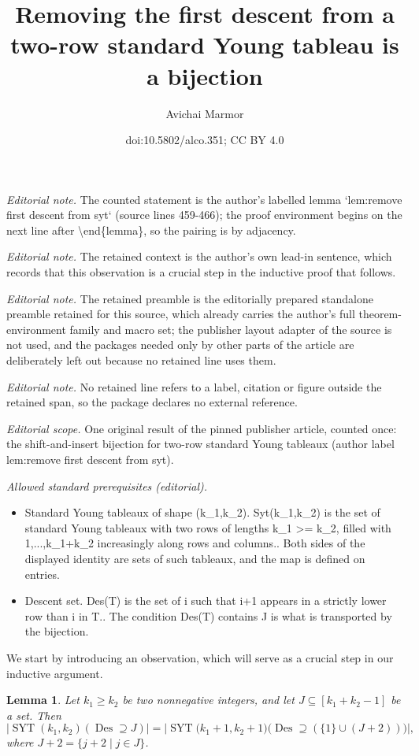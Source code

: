 \documentclass[11pt]{article}
\title{Removing the first descent from a two-row standard Young tableau is a bijection}
\author{Avichai Marmor}
\date{doi:10.5802/alco.351; CC BY 4.0}
\newtheorem{lemma}[theo]{Lemma}
\theoremstyle{definition}
\numberwithin{equation}{section}
\newcommand{\Des}{\operatorname{Des}}
\newcommand{\Syt}{\operatorname{SYT}}
\begin{document}
\maketitle
\noindent\textit{Editorial note.} The counted statement is the author's labelled lemma `lem:remove first descent from syt` (source lines 459-466); the proof environment begins on the next line after \textbackslash{}end\{lemma\}, so the pairing is by adjacency.\par\medskip
\noindent\textit{Editorial note.} The retained context is the author's own lead-in sentence, which records that this observation is a crucial step in the inductive proof that follows.\par\medskip
\noindent\textit{Editorial note.} The retained preamble is the editorially prepared standalone preamble retained for this source, which already carries the author's full theorem-environment family and macro set; the publisher layout adapter of the source is not used, and the packages needed only by other parts of the article are deliberately left out because no retained line uses them.\par\medskip
\noindent\textit{Editorial note.} No retained line refers to a label, citation or figure outside the retained span, so the package declares no external reference.\par\medskip
\noindent\textit{Editorial scope.} One original result of the pinned publisher article, counted once: the shift-and-insert bijection for two-row standard Young tableaux (author label lem:remove first descent from syt).\par\medskip
\noindent\textit{Allowed standard prerequisites (editorial).}\begin{itemize}
\item Standard Young tableaux of shape (k\_1,k\_2). Syt(k\_1,k\_2) is the set of standard Young tableaux with two rows of lengths k\_1 >= k\_2, filled with 1,...,k\_1+k\_2 increasingly along rows and columns.. Both sides of the displayed identity are sets of such tableaux, and the map is defined on entries.
\item Descent set. Des(T) is the set of i such that i+1 appears in a strictly lower row than i in T.. The condition Des(T) contains J is what is transported by the bijection.
\end{itemize}\medskip
We start by introducing an observation, which will serve as a crucial step in our inductive argument.

\begin{lemma}
\label{lem:remove first descent from syt}
    Let $k_1 \ge k_2$ be two nonnegative integers, and let $J \subseteq [k_1 + k_2 - 1]$ be a set. Then
    \[
        \left|\Syt(k_1, k_2)(\Des \supseteq J)\right| = \left|\Syt\big(k_1+1, k_2+1\big)\big(\Des \supseteq (\{1\}\cup (J+2))\big)\right|,
    \]
    where $J+2 = \{j + 2 \mid j \in J\}$.
\end{lemma}
\end{document}
